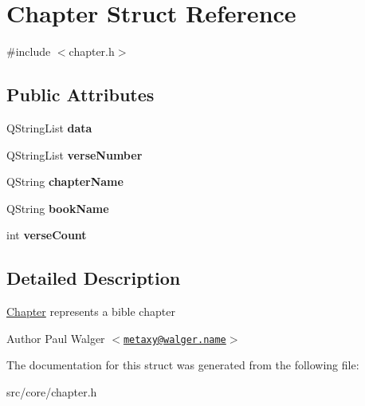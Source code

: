 \hypertarget{structChapter}{
\section{Chapter Struct Reference}
\label{structChapter}
}


{\ttfamily \#include $<$chapter.h$>$}

\subsection*{Public Attributes}
\begin{DoxyCompactItemize}
\item 
\hypertarget{structChapter_a321e378b12d5fed1ba2fae4affdb78c7}{
QStringList {\bfseries data}}
\label{structChapter_a321e378b12d5fed1ba2fae4affdb78c7}

\item 
\hypertarget{structChapter_a29c571d490cce0129070cefe1fe0da61}{
QStringList {\bfseries verseNumber}}
\label{structChapter_a29c571d490cce0129070cefe1fe0da61}

\item 
\hypertarget{structChapter_a33e98674c40021c573e2395cc53f5dc2}{
QString {\bfseries chapterName}}
\label{structChapter_a33e98674c40021c573e2395cc53f5dc2}

\item 
\hypertarget{structChapter_a7fcbb066f25d59fb5877582ab7dad46c}{
QString {\bfseries bookName}}
\label{structChapter_a7fcbb066f25d59fb5877582ab7dad46c}

\item 
\hypertarget{structChapter_af1670eaa97d549f1d95686507665a1aa}{
int {\bfseries verseCount}}
\label{structChapter_af1670eaa97d549f1d95686507665a1aa}

\end{DoxyCompactItemize}


\subsection{Detailed Description}
\hyperlink{structChapter}{Chapter} represents a bible chapter

\begin{DoxyAuthor}{Author}
Paul Walger $<$\href{mailto:metaxy@walger.name}{\tt metaxy@walger.name}$>$ 
\end{DoxyAuthor}


The documentation for this struct was generated from the following file:\begin{DoxyCompactItemize}
\item 
src/core/chapter.h\end{DoxyCompactItemize}
